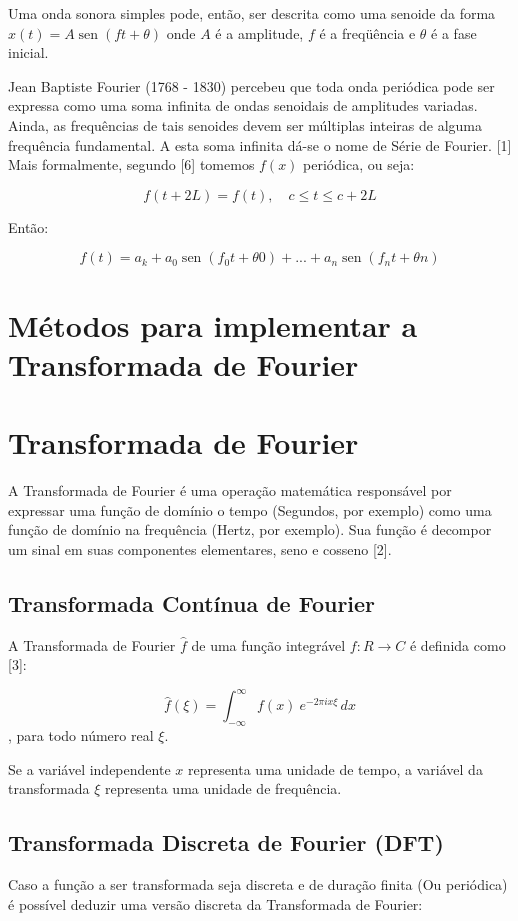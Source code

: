 \documentclass[brazil,times]{abnt}
\begin{document}
	Uma onda sonora simples pode, então, ser descrita como uma senoide da forma $x(t) = A \operatorname{sen} (ft + \theta)$ onde $A$ é a amplitude, $f$ é a freqüência e $\theta$ é a fase inicial.

	Jean Baptiste Fourier (1768 - 1830) percebeu que toda onda periódica pode ser expressa como uma soma infinita de ondas senoidais de amplitudes variadas. Ainda, as frequências de tais senoides devem ser múltiplas inteiras de alguma frequência fundamental. A esta soma infinita dá-se o nome de Série de Fourier. [1] Mais formalmente, segundo [6] tomemos $f(x)$ periódica, ou seja:


	$$f(t + 2L) = f(t), \quad c \le t \le c + 2L$$

	Então:

	$$f(t) = a_k + a_0\operatorname{sen}(f_0t + \theta0) +... + a_n\operatorname{sen} (f_nt + \theta n)$$



\section*{Métodos para implementar a Transformada de Fourier}



\section*{Transformada de Fourier}
	A Transformada de Fourier é uma operação matemática responsável por expressar uma função de domínio o tempo (Segundos, por exemplo) como uma função de domínio na frequência (Hertz, por exemplo). Sua função é decompor um sinal em suas componentes elementares, seno e cosseno [2].

	\subsection*{Transformada Contínua de Fourier}
		A Transformada de Fourier $\hat{f}$ de uma função integrável $f: R \rightarrow C$ é definida como [3]:

		$$\hat{f}(\xi) = \int_{-\infty}^{\infty} f(x)\ e^{- 2\pi i x \xi}\,dx$$, para todo número real $\xi$.

		Se a variável independente $x$ representa uma unidade de tempo, a variável da transformada $\xi$ representa uma unidade de frequência. 

	\subsection*{Transformada Discreta de Fourier (DFT)}
		Caso a função a ser transformada seja discreta e de duração finita (Ou periódica) é possível deduzir uma versão discreta da Transformada de Fourier:
\end{document}

